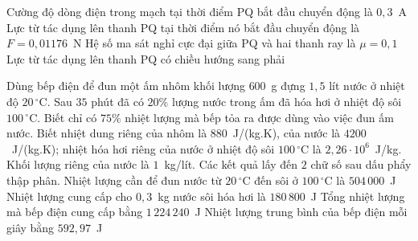 \begin{ex}
\begin{center}
		\end{center}
		\choiceTFt
		{Cường độ dòng điện trong mạch tại thời điểm PQ bắt đầu chuyển động là $0{,}3$~A}
		{Lực từ tác dụng lên thanh PQ tại thời điểm nó bắt đầu chuyển động là $F=0{,}01176$~N}
		{\True Hệ số ma sát nghỉ cực đại giữa PQ và hai thanh ray là $\mu=0{,}1$}
		{\True Lực từ tác dụng lên thanh PQ có chiều hướng sang phải}
	\end{ex}

	\begin{ex}%
		Dùng bếp điện để đun một ấm nhôm khối lượng $600$~g đựng $1{,}5$ lít nước ở nhiệt độ $20\,^\circ\text{C}$. Sau $35$ phút đã có $20\%$ lượng nước trong ấm đã hóa hơi ở nhiệt độ sôi $100\,^\circ\text{C}$. Biết chỉ có $75\%$ nhiệt lượng mà bếp tỏa ra được dùng vào việc đun ấm nước. Biết nhiệt dung riêng của nhôm là $880$~J/(kg.K), của nước là $4200$~J/(kg.K); nhiệt hóa hơi riêng của nước ở nhiệt độ sôi $100\,^\circ\text{C}$ là $2{,}26\cdot 10^6$~J/kg. Khối lượng riêng của nước là $1$~kg/lít. Các kết quả lấy đến $2$ chữ số sau dấu phẩy thập phân.
		\choiceTFt
		{\True Nhiệt lượng cần để đun nước từ $20\,^\circ\text{C}$ đến sôi ở $100\,^\circ\text{C}$ là $504\,000$~J}
		{Nhiệt lượng cung cấp cho $0{,}3$~kg nước sôi hóa hơi là $180\,800$~J}
		{\True Tổng nhiệt lượng mà bếp điện cung cấp bằng $1\,224\,240$~J}
		{Nhiệt lượng trung bình của bếp điện mỗi giây bằng $592{,}97$~J}
	\end{ex}

